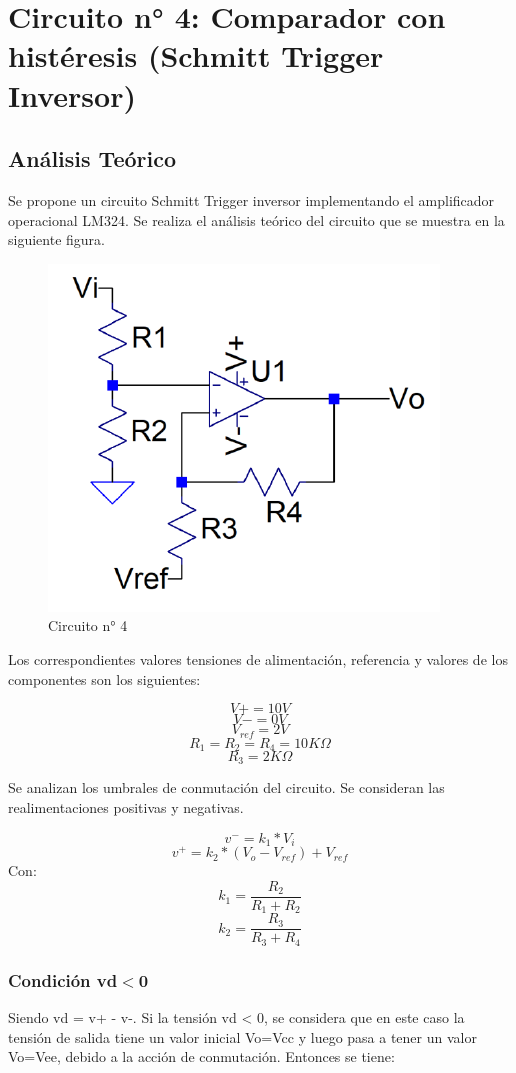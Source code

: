 \section{Circuito n° 4: Comparador con histéresis (Schmitt Trigger Inversor)}



\subsection{Análisis Teórico}

Se propone un circuito Schmitt Trigger inversor implementando el amplificador operacional LM324. Se realiza el análisis teórico del circuito que se muestra en la siguiente figura. 


\begin{figure}[h!]
    \centering
    \includegraphics[width=0.70\linewidth]{Secciones/Circuito4/Circuito 4.png}
    \caption{Circuito n° 4}
    \label{fig:enter-label}
\end{figure}

Los correspondientes valores tensiones de alimentación, referencia y valores de los componentes son los siguientes:

\[V+ = 10V\]
\[V- = 0V\]
\[V_{ref} = 2V\]
\[R_1 = R_2 = R_4 = 10K\Omega\]
\[R_3 = 2K\Omega\]

Se analizan los umbrales de conmutación del circuito. Se consideran las realimentaciones positivas y negativas.

\[v^- = k_1 * V_i\]
\[v^+ = k_2 * (V_o - V_{ref}) + V_{ref}\]
Con:
\[k_1 = \frac{R_2}{R_1 + R_2}\]
\[ k_2 = \frac{R_3}{R_3 + R_4}\]
\subsubsection{Condición vd$<$0}
Siendo vd = v+ - v-. Si la tensión vd < 0, se considera que en este caso la tensión de salida tiene un valor inicial Vo=Vcc y luego pasa a tener un valor Vo=Vee, debido a la acción de conmutación.  Entonces se tiene:

